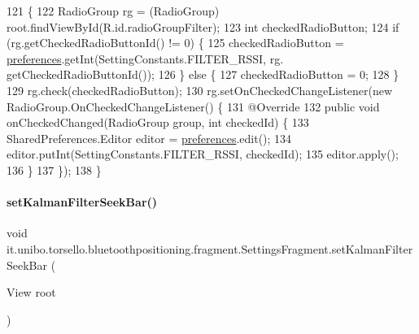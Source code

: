 \begin{DoxyCode}
121                                          \{
122         RadioGroup rg = (RadioGroup) root.findViewById(R.id.radioGroupFilter);
123         \textcolor{keywordtype}{int} checkedRadioButton;
124         \textcolor{keywordflow}{if} (rg.getCheckedRadioButtonId() != 0) \{
125             checkedRadioButton = \hyperlink{classit_1_1unibo_1_1torsello_1_1bluetoothpositioning_1_1fragment_1_1SettingsFragment_a52480c4d5d81ca59fe4a98ae3c623ea4_a52480c4d5d81ca59fe4a98ae3c623ea4}{preferences}.getInt(SettingConstants.FILTER\_RSSI, rg.
      getCheckedRadioButtonId());
126         \} \textcolor{keywordflow}{else} \{
127             checkedRadioButton = 0;
128         \}
129         rg.check(checkedRadioButton);
130         rg.setOnCheckedChangeListener(\textcolor{keyword}{new} RadioGroup.OnCheckedChangeListener() \{
131             @Override
132             \textcolor{keyword}{public} \textcolor{keywordtype}{void} onCheckedChanged(RadioGroup group, \textcolor{keywordtype}{int} checkedId) \{
133                 SharedPreferences.Editor editor = \hyperlink{classit_1_1unibo_1_1torsello_1_1bluetoothpositioning_1_1fragment_1_1SettingsFragment_a52480c4d5d81ca59fe4a98ae3c623ea4_a52480c4d5d81ca59fe4a98ae3c623ea4}{preferences}.edit();
134                 editor.putInt(SettingConstants.FILTER\_RSSI, checkedId);
135                 editor.apply();
136             \}
137         \});
138     \}
\end{DoxyCode}
\hypertarget{classit_1_1unibo_1_1torsello_1_1bluetoothpositioning_1_1fragment_1_1SettingsFragment_a84057f1633708ec85de5968ed9e7f032_a84057f1633708ec85de5968ed9e7f032}{}\label{classit_1_1unibo_1_1torsello_1_1bluetoothpositioning_1_1fragment_1_1SettingsFragment_a84057f1633708ec85de5968ed9e7f032_a84057f1633708ec85de5968ed9e7f032} 
\paragraph{\texorpdfstring{set\+Kalman\+Filter\+Seek\+Bar()}{setKalmanFilterSeekBar()}}
{\footnotesize\ttfamily void it.\+unibo.\+torsello.\+bluetoothpositioning.\+fragment.\+Settings\+Fragment.\+set\+Kalman\+Filter\+Seek\+Bar (\begin{DoxyParamCaption}\item[{View}]{root }\end{DoxyParamCaption})\hspace{0.3cm}{\ttfamily [private]}}


